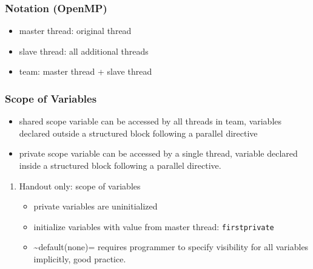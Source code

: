 \documentclass[11pt]{article}
\begin{document}
\subsubsection{Notation (OpenMP)}
\label{sec-2-2-2}
\begin{itemize}
\item master thread: original thread
\item slave thread: all additional threads
\item team: master thread + slave thread
\end{itemize}
\subsubsection{Scope of Variables}
\label{sec-2-2-3}
\begin{itemize}
\item shared scope
variable can be accessed by all threads in team, variables declared outside a structured block following a parallel directive
\item private scope
variable can be accessed by a single thread, variable declared inside a structured block following a parallel directive.
\end{itemize}
\begin{enumerate}
\item Handout only: scope of variables
\label{sec-2-2-3-1}
\begin{itemize}
\item private variables are uninitialized
\item initialize variables with value from master thread: \verb~firstprivate~
\item \textasciitilde{}default(none)= requires programmer to specify visibility for all variables implicitly, good practice.
\end{itemize}
\end{enumerate}
\end{document}

